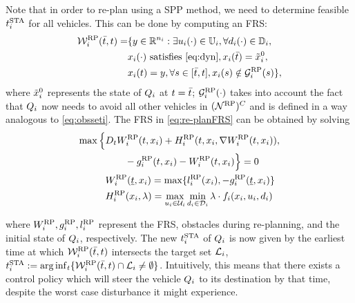 Note that in order to re-plan using a SPP method, we need to determine feasible $t^\text{STA}_i$ for all vehicles. This can be done by computing an FRS:
\begin{equation} \label{eq:re-planFRS}
\begin{aligned} 
\frs_i^{\text{RP}}(\tea, t) = & \{y \in \R^{n_i}: \exists \ctrl_i(\cdot) \in \cfset_i, \forall \dstb_i(\cdot) \in \dfset_i, \\
& \state_i(\cdot) \text{ satisfies \eqref{eq:dyn}}, \state_i(\tea) = \tilde{\state}_i^0, \\
& \state_i(t) = y, \forall s \in [\tea, t], \state_i(s) \notin \obsset_i^{\text{RP}}(s) \},
\end{aligned}
\end{equation}
\noindent where $\tilde{x}_i^0$ represents the state of $Q_i$ at $t = \bar{t}$; $\mathcal{G}_i^{\text{RP}}(\cdot)$ takes into account the fact that $Q_i$ now needs to avoid all other vehicles in $(\mathcal{N}^\text{RP})^C$ and is defined in a way analogous to \eqref{eq:obsseti}. The FRS in \eqref{eq:re-planFRS} can be obtained by solving %
\begin{equation}
\begin{aligned}
\max \Big\{&D_t W_i^{\text{RP}}(t, x_i) + H_i^{\text{RP}}(t, x_i, \nabla W_i^{\text{RP}}(t, x_i)), \\
&\qquad - g_i^{\text{RP}}(t, x_i) - W_i^{\text{RP}}(t, x_i) \Big\} = 0\\
&W_i^{\text{RP}}(\underline{t}, x_i) = \max\{l_i^{\text{RP}}(x_i), -g_i^{\text{RP}}(\underline{t}, x_i)\} \\
&H_i^{\text{RP}}(x_i, \lambda) = \max_{u_i \in \mathcal{U}_i} \min_{d_i \in \mathcal{D}_i} \lambda \cdot f_i (x_i, u_i, d_i)
\end{aligned}
\end{equation} 

\noindent where $W_i^{\text{RP}}, g_i^{\text{RP}}, l_i^{\text{RP}}$ represent the FRS, obstacles during re-planning, and the initial state of $Q_i$, respectively. The new $t^\text{STA}_i$ of $Q_i$ is now given by the earliest time at which $\mathcal{W}_i^{\text{RP}}(\bar{t}, t)$ intersects the target set $\mathcal{L}_i$, $t^\text{STA}_i := \arg \inf_t \{ \mathcal{W}_i^{\text{RP}}(\bar{t}, t) \cap \mathcal{L}_i \neq \emptyset \}$. Intuitively, this means that there exists a control policy which will steer the vehicle $Q_i$ to its destination by that time, despite the worst case disturbance it might experience.

